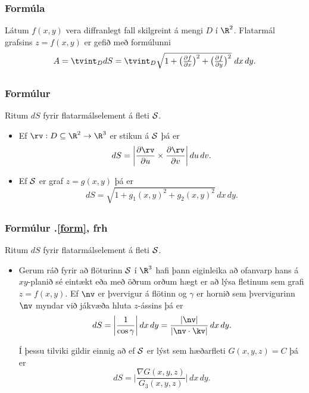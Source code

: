 \subsubsection{Formúla \rtask{}}
 Látum $f(x,y)$ vera diffranlegt fall skilgreint á
mengi $D$ í $\R^2$.  Flatarmál grafsins $z=f(x,y)$ er gefið með
formúlunni 
$$A=\tvint_D dS=\tvint_D {\textstyle\sqrt{1+
\big(\frac{\partial f}{\partial x}\big)^2+
\big(\frac{\partial f}{\partial y}\big)^2}}\,\,dx\,dy.$$




\subsection{} 

\subsubsection{Formúlur }

 Ritum $dS$ fyrir flatarmálselement á fleti $\cal S$.  
\begin{itemize}
\item Ef $\rv:D\subseteq\R^2\rightarrow \R^3$ er stikun á $\cal S$ þá
  er $$dS=\bigg|\frac{\partial \rv}{\partial u}\times\frac{\partial
  \rv}{\partial v}\bigg|\,du\,dv.$$
\item Ef $\cal S$ er graf $z=g(x,y)$ þá er 
$$dS=\sqrt{1+g_1(x,y)^2+g_2(x,y)^2}\,dx\,dy.$$


\end{itemize}




\subsection{}
\subsubsection{Formúlur \kaflanr.\ref{form}, frh}

 Ritum $dS$ fyrir flatarmálselement á fleti $\cal S$.  
\begin{itemize}
\item Gerum ráð fyrir að flöturinn $\cal S$ í $\R^3$ hafi þann eiginleika að
  ofanvarp hans á $xy$-planið sé eintækt eða með öðrum orðum hægt er
  að lýsa fletinum sem grafi $z=f(x,y)$.
Ef $\nv$ er þvervigur á
flötinn og $\gamma$ er hornið sem þvervigurinn $\nv$ myndar við
jákvæða hluta $z$-ássins þá er 
$$dS=\bigg|\frac{1}{\cos\gamma}\bigg|\,dx\,dy
=\frac{|\nv|}{|\nv\cdot\kv|}\,dx\,dy.$$

Í þessu tilviki gildir einnig að ef $\cal S$ er lýst sem 
hæðarfleti $G(x,y,z)=C$ þá er 
$$dS=\bigg|\frac{\nabla G(x,y,z)}{G_3(x,y,z)}\bigg|\,dx\,dy.$$
\end{itemize}








